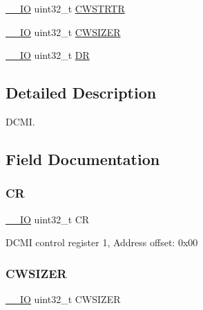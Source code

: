 \begin{DoxyCompactItemize}
\item 
\mbox{\hyperlink{core__sc300_8h_aec43007d9998a0a0e01faede4133d6be}{\+\_\+\+\_\+\+IO}} uint32\+\_\+t \mbox{\hyperlink{struct_d_c_m_i___type_def_a919b70dd8762e44263a02dfbafc7b8ce}{C\+W\+S\+T\+R\+TR}}
\item 
\mbox{\hyperlink{core__sc300_8h_aec43007d9998a0a0e01faede4133d6be}{\+\_\+\+\_\+\+IO}} uint32\+\_\+t \mbox{\hyperlink{struct_d_c_m_i___type_def_aa3ccc5d081bbee3c61ae9aa5e0c83af9}{C\+W\+S\+I\+Z\+ER}}
\item 
\mbox{\hyperlink{core__sc300_8h_aec43007d9998a0a0e01faede4133d6be}{\+\_\+\+\_\+\+IO}} uint32\+\_\+t \mbox{\hyperlink{struct_d_c_m_i___type_def_a3df0d8dfcd1ec958659ffe21eb64fa94}{DR}}
\end{DoxyCompactItemize}


\subsection{Detailed Description}
D\+C\+MI. 

\subsection{Field Documentation}
\mbox{\label{struct_d_c_m_i___type_def_ab40c89c59391aaa9d9a8ec011dd0907a}} 
\subsubsection{\texorpdfstring{CR}{CR}}
{\footnotesize\ttfamily \mbox{\hyperlink{core__sc300_8h_aec43007d9998a0a0e01faede4133d6be}{\+\_\+\+\_\+\+IO}} uint32\+\_\+t CR}

D\+C\+MI control register 1, Address offset\+: 0x00 \mbox{\label{struct_d_c_m_i___type_def_aa3ccc5d081bbee3c61ae9aa5e0c83af9}} 
\subsubsection{\texorpdfstring{C\+W\+S\+I\+Z\+ER}{CWSIZER}}
{\footnotesize\ttfamily \mbox{\hyperlink{core__sc300_8h_aec43007d9998a0a0e01faede4133d6be}{\+\_\+\+\_\+\+IO}} uint32\+\_\+t C\+W\+S\+I\+Z\+ER}

